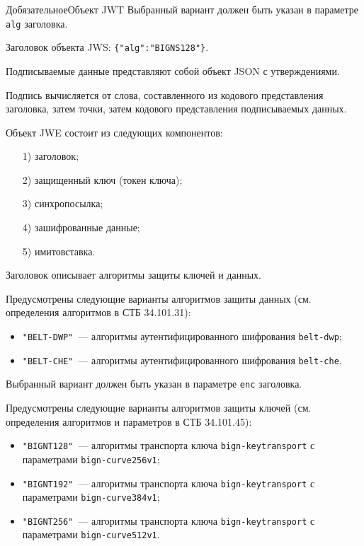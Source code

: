 \begin{appendix}{Д}{обязательное}{Объект JWT}
Выбранный вариант должен быть указан в параметре \lstinline{alg} заголовка.

\begin{example*}
Заголовок объекта JWS: \lstinline|{"alg":"BIGNS128"}|.
\end{example*}

Подписываемые данные представляют собой объект JSON с утверждениями. 

Подпись вычисляется от слова, составленного из кодового представления 
заголовка, затем точки, затем кодового представления подписываемых данных. 


Объект JWE состоит из следующих компонентов:
\begin{enumerate}
\item[1)] 
заголовок;
\item[2)] 
защищенный ключ (токен ключа);
\item[3)] 
синхропосылка;
\item[4)]
зашифрованные данные;
\item[5)]
имитовставка.
\end{enumerate}

Заголовок описывает алгоритмы защиты ключей и данных.

Предусмотрены следующие варианты алгоритмов защиты данных
(см. определения алгоритмов в СТБ 34.101.31):
\begin{itemize}
\item
\lstinline{"BELT-DWP"}~--- алгоритмы аутентифицированного шифрования 
\lstinline{belt-dwp}; 
\item
\lstinline{"BELT-CHE"}~--- алгоритмы аутентифицированного шифрования 
\lstinline{belt-che}.
\end{itemize}

Выбранный вариант должен быть указан в параметре \lstinline{enc} заголовка.

Предусмотрены следующие варианты алгоритмов защиты ключей
(см. определения алгоритмов и параметров в СТБ 34.101.45):
\begin{itemize}
\item
\lstinline{"BIGNT128"}~--- алгоритмы транспорта ключа 
\lstinline{bign-keytransport} с параметрами \lstinline{bign-curve256v1};
\item
\lstinline{"BIGNT192"}~--- алгоритмы транспорта ключа 
\lstinline{bign-keytransport} с параметрами \lstinline{bign-curve384v1};
\item
\lstinline{"BIGNT256"}~--- алгоритмы транспорта ключа 
\lstinline{bign-keytransport} с параметрами \lstinline{bign-curve512v1}. 
\end{itemize}


\end{appendix}
